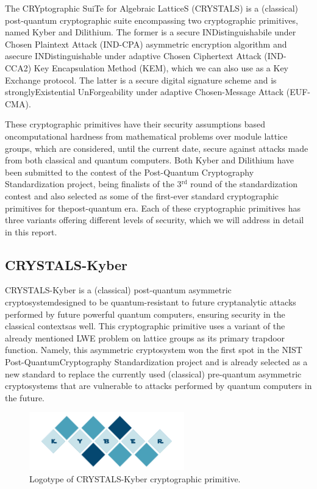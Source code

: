 \documentclass[runningheads]{llncs}
\numberwithin{equation}{section}
\begin{document}
    The CRYptographic SuiTe for Algebraic LatticeS (CRYSTALS) is a (classical) post-quantum cryptographic suite encompassing two cryptographic primitives, named Kyber and Dilithium. The former is a secure INDistinguishabile under Chosen Plaintext Attack (IND-CPA) asymmetric encryption algorithm and a\break secure INDistinguishable under adaptive Chosen Ciphertext Attack (IND-CCA2) Key Encapsulation Method (KEM), which we can also use as a Key Exchange protocol. The latter is a secure digital signature scheme and is strongly\break Existential UnForgeability under adaptive Chosen-Message Attack (EUF-CMA).
    
    These cryptographic primitives have their security assumptions based on\break computational hardness from mathematical problems over module lattice groups, which are considered, until the current date, secure against attacks made from both classical and quantum computers. Both Kyber and Dilithium have been submitted to the contest of the Post-Quantum Cryptography Standardization project, being finalists of the 3${}^{\mathrm{rd}}$ round of the standardization contest and also selected as some of the first-ever standard cryptographic primitives for the\break post-quantum era. Each of these cryptographic primitives has three variants offering different levels of security, which we will address in detail in this report.
        
    \subsection{CRYSTALS-Kyber}
    \label{subsec:crystals-kyber}

    CRYSTALS-Kyber is a (classical) post-quantum asymmetric cryptosystem\break designed to be quantum-resistant to future cryptanalytic attacks performed by future powerful quantum computers, ensuring security in the classical contexts\break as well. This cryptographic primitive uses a variant of the already mentioned LWE problem on lattice groups as its primary trapdoor function. Namely, this asymmetric cryptosystem won the first spot in the NIST Post-Quantum\break Cryptography Standardization project and is already selected as a new standard to replace the currently used (classical) pre-quantum asymmetric cryptosystems that are vulnerable to attacks performed by quantum computers in the future.

    \vspace{-3ex}
    \begin{figure}[!ht]
        \centering
        \captionsetup{justification=centering}
        \includegraphics[width=0.6\textwidth]{figures/sections/section-3/crystals-kyber.pdf}
        \caption{Logotype of CRYSTALS-Kyber cryptographic primitive.}
        \label{fig:crystals-kyber-logo}
    \end{figure}
\end{document}
